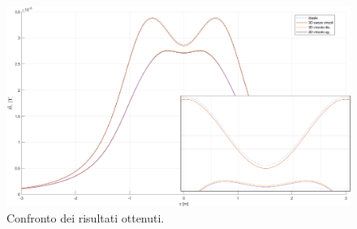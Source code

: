 \documentclass[a4paper, 11pt]{article}
\begin{document}
\begin{figure}[H]
    \centering
        \includegraphics[width=16cm]{assets/figure12}
        \caption{Confronto dei risultati ottenuti.}
\end{figure}
\end{document}
